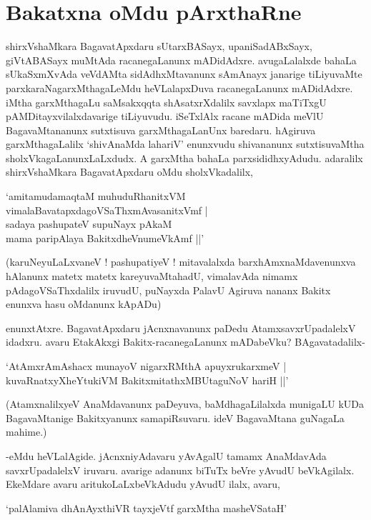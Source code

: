 \chapter{Bakatxna oMdu pArxthaRne}\label{chap11}

shirxVshaMkara BagavatApxdaru sUtarxBASayx, upaniSadABxSayx, giVtABASayx muMtAda racanegaLanunx mADidAdxre. avugaLalalxde bahaLa sUkaSxmXvAda veVdAMta sidAdhxMtavanunx sAmAnayx janarige tiLiyuvaMte parxkaraNagarxMthagaLeMdu heVLalapxDuva racanegaLanunx mADidAdxre. iMtha garxMthagaLu saMsakxqqta shAsatxrXdalilx savxlapx maTiTxgU pAMDitayxvilalxdavarige tiLiyuvudu. iSeTxlAlx racane mADida meVlU BagavaMtananunx sutxtisuva garxMthagaLanUnx baredaru. hAgiruva garxMthagaLalilx `shivAnaMda lahariV' enunxvudu shivananunx sutxtisuvaMtha sholxVkagaLanunxLaLxdudx. A garxMtha bahaLa parxsididhxyAdudu. adaralilx shirxVshaMkara BagavatApxdaru oMdu sholxVkadalilx,

\begin{shloka}
`amitamudamaqtaM muhuduRhanitxVM\\
vimalaBavatapxdagoVSaThxmAvasanitxVmf |\\
sadaya pashupateV supuNayx pAkaM\\
mama paripAlaya BakitxdheVnumeVkAmf ||'
\end{shloka}

(karuNeyuLaLxvaneV ! pashupatiyeV ! mitavalalxda barxhAmxnaMdavenunxva hAlanunx matetx matetx kareyuvaMtahadU, vimalavAda nimamx pAdagoVSaThxdalilx iruvudU, puNayxda PalavU Agiruva nananx Bakitx enunxva hasu oMdanunx kApADu)

enunxtAtxre. BagavatApxdaru jAcnxnavanunx paDedu AtamxsavxrUpadalelxV idadxru. avaru EtakAkxgi Bakitx-racanegaLanunx mADabeVku? BAgavatadalilx-

\begin{shloka}
`AtAmxrAmAshacx munayoV nigarxRMthA apuyxrukarxmeV |\\
kuvaRnatxyXheYtukiVM BakitxmitathxMBUtaguNoV hariH ||'
\end{shloka}

(AtamxnalilxyeV AnaMdavanunx paDeyuva, baMdhagaLilalxda munigaLU kUDa BagavaMtanige Bakitxyanunx samapiRsuvaru. ideV BagavaMtana guNagaLa mahime.)

-eMdu heVLalAgide. jAcnxniyAdavaru yAvAgalU tamamx AnaMdavAda savxrUpadalelxV iruvaru. avarige adanunx biTuTx beVre yAvudU beVkAgilalx. EkeMdare avaru aritukoLaLxbeVkAdudu yAvudU ilalx, avaru,

\begin{shloka}
`palAlamiva dhAnAyxthiVR tayxjeVtf garxMtha masheVSataH'
\end{shloka}

